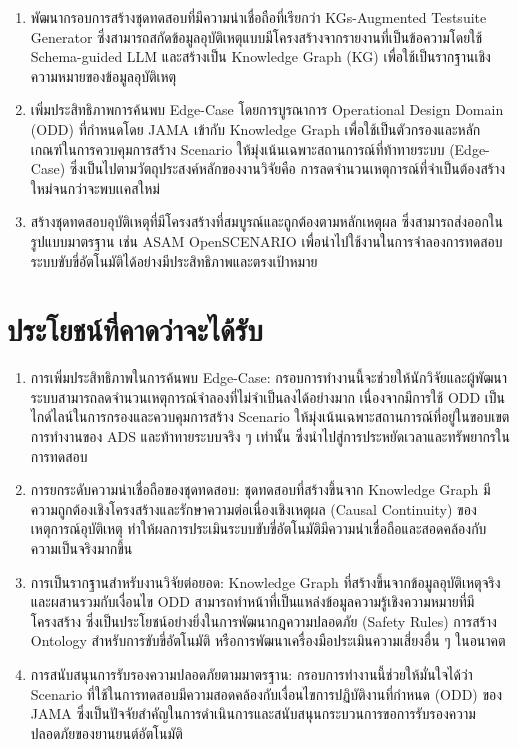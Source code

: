 \begin{enumerate}[label=\arabic*.)]
    \item พัฒนากรอบการสร้างชุดทดสอบที่มีความน่าเชื่อถือที่เรียกว่า KGs-Augmented Testsuite Generator ซึ่งสามารถสกัดข้อมูลอุบัติเหตุแบบมีโครงสร้างจากรายงานที่เป็นข้อความโดยใช้ Schema-guided LLM และสร้างเป็น Knowledge Graph (KG) เพื่อใช้เป็นรากฐานเชิงความหมายของข้อมูลอุบัติเหตุ
    \item เพิ่มประสิทธิภาพการค้นพบ Edge-Case โดยการบูรณาการ Operational Design Domain (ODD) ที่กำหนดโดย JAMA เข้ากับ Knowledge Graph เพื่อใช้เป็นตัวกรองและหลักเกณฑ์ในการควบคุมการสร้าง Scenario ให้มุ่งเน้นเฉพาะสถานการณ์ที่ท้าทายระบบ (Edge-Case) ซึ่งเป็นไปตามวัตถุประสงค์หลักของงานวิจัยคือ การลดจำนวนเหตุการณ์ที่จำเป็นต้องสร้างใหม่จนกว่าจะพบเเคสใหม่
    \item สร้างชุดทดสอบอุบัติเหตุที่มีโครงสร้างที่สมบูรณ์และถูกต้องตามหลักเหตุผล ซึ่งสามารถส่งออกในรูปแบบมาตรฐาน เช่น ASAM OpenSCENARIO เพื่อนำไปใช้งานในการจำลองการทดสอบ ระบบขับขี่อัตโนมัติได้อย่างมีประสิทธิภาพและตรงเป้าหมาย
\end{enumerate}

\section{ประโยชน์ที่คาดว่าจะได้รับ}\label{sec:expected-benefits}

\begin{enumerate}[label=\arabic*.)]
    \item การเพิ่มประสิทธิภาพในการค้นพบ Edge-Case: กรอบการทำงานนี้จะช่วยให้นักวิจัยและผู้พัฒนาระบบสามารถลดจำนวนเหตุการณ์จำลองที่ไม่จำเป็นลงได้อย่างมาก เนื่องจากมีการใช้ ODD เป็นไกด์ไลน์ในการกรองและควบคุมการสร้าง Scenario ให้มุ่งเน้นเฉพาะสถานการณ์ที่อยู่ในขอบเขตการทำงานของ ADS และท้าทายระบบจริง ๆ เท่านั้น ซึ่งนำไปสู่การประหยัดเวลาและทรัพยากรในการทดสอบ
    \item การยกระดับความน่าเชื่อถือของชุดทดสอบ: ชุดทดสอบที่สร้างขึ้นจาก Knowledge Graph มีความถูกต้องเชิงโครงสร้างและรักษาความต่อเนื่องเชิงเหตุผล (Causal Continuity) ของเหตุการณ์อุบัติเหตุ ทำให้ผลการประเมินระบบขับขี่อัตโนมัติมีความน่าเชื่อถือและสอดคล้องกับความเป็นจริงมากขึ้น
    \item การเป็นรากฐานสำหรับงานวิจัยต่อยอด: Knowledge Graph ที่สร้างขึ้นจากข้อมูลอุบัติเหตุจริงและผสานรวมกับเงื่อนไข ODD สามารถทำหน้าที่เป็นแหล่งข้อมูลความรู้เชิงความหมายที่มีโครงสร้าง ซึ่งเป็นประโยชน์อย่างยิ่งในการพัฒนากฎความปลอดภัย (Safety Rules) การสร้าง Ontology สำหรับการขับขี่อัตโนมัติ หรือการพัฒนาเครื่องมือประเมินความเสี่ยงอื่น ๆ ในอนาคต
    \item การสนับสนุนการรับรองความปลอดภัยตามมาตรฐาน: กรอบการทำงานนี้ช่วยให้มั่นใจได้ว่า Scenario ที่ใช้ในการทดสอบมีความสอดคล้องกับเงื่อนไขการปฏิบัติงานที่กำหนด (ODD) ของ JAMA ซึ่งเป็นปัจจัยสำคัญในการดำเนินการและสนับสนุนกระบวนการขอการรับรองความปลอดภัยของยานยนต์อัตโนมัติ
\end{enumerate}

